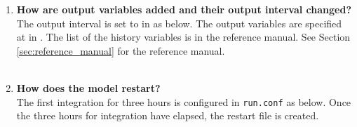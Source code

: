 \begin{enumerate}
\item {\bf How are output variables added and their output interval changed?}\\

The output interval is set to  in  as below. The output variables are specified at  in . The list of the history variables is in the reference manual.
See Section \ref{sec:reference_manual} for the reference manual.\\

\\



\item {\bf How does the model restart?}\\

The first integration for three hours is configured in \verb|run.conf| as below.
Once the three hours for integration have elapsed, the restart file is created.\\


\end{enumerate}
